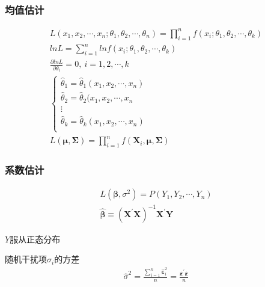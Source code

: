 \documentclass[12pt]{book}
\begin{document}
\subsubsection{均值估计}

\begin{gather*}
    L\left(x_1,x_2,\cdots,x_n;\theta_1,\theta_2,\cdots,\theta_n\right) =\prod_{i=1}^{n}f\left(x_i;\theta_1,\theta_2,\cdots,\theta_k\right)\\
    lnL=\sum_{i=1}^{n}lnf\left(x_i;\theta_1,\theta_2,\cdots,\theta_k\right)\\
    \frac{\partial lnL}{\partial\theta_i}=0,\ i=1,2,\cdots,k\\
    \begin{cases}
        \hat{\theta}_1 = \hat{\theta}_1(x_1,x_2,\cdots,x_n) \\
        \hat{\theta}_2 = \hat{\theta}_2(x_1,x_2,\cdots,x_n  \\
        \vdots                                              \\
        \hat{\theta}_k = \hat{\theta}_k(x_1,x_2,\cdots,x_n) \\
    \end{cases}	\\
    L\left(\bm{\mu},\bm{\Sigma}\right) =\prod_{i=1}^{n}{f(\bm{X}_i,\bm{\mu},\bm{\Sigma})}
\end{gather*}


\subsubsection{系数估计}

\begin{gather*}
    L\left(\bm{\beta},\sigma^2\right) 	=P\left(Y_1,Y_2,\cdots,Y_n\right) \\
    \hat{\bm{\beta}} 	\equiv \left(\bm{X}^\prime\bm{X}\right)^{-1}\bm{X}^\prime\bm{Y}
\end{gather*}


$Y$服从正态分布

随机干扰项$\sigma_i$的方差
\begin{gather*}
    {\hat{\sigma}}^2
    =\frac{
    \sum_{i=1}^{n}{
    {\hat{\bm{\varepsilon}}}_i^2}
    }{n}
    =\frac{
        {\hat{\bm{\varepsilon}}}^\prime \hat{\bm{\varepsilon}}
    }{n}
\end{gather*}
\end{document}
